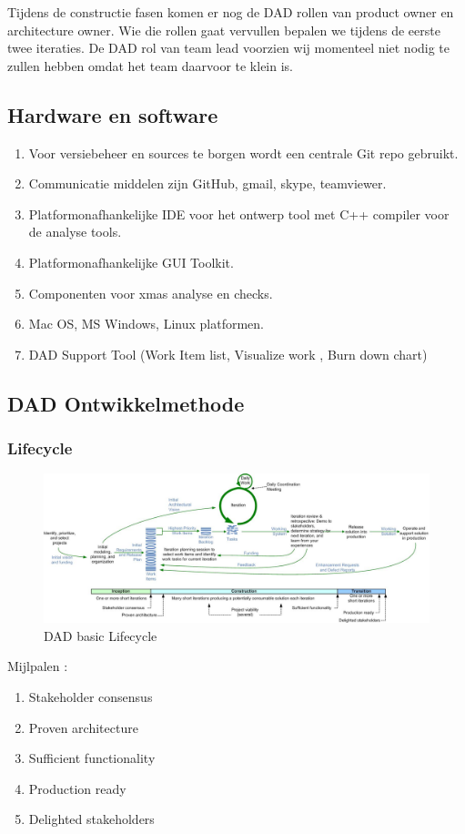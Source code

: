  Tijdens de constructie fasen komen er nog de DAD rollen van product owner en architecture owner.
 Wie die rollen gaat vervullen bepalen we tijdens de eerste twee iteraties.
 De DAD rol van team lead voorzien wij momenteel niet nodig te zullen hebben omdat het team daarvoor
 te klein is.


\subsection{Hardware en software}
\begin{enumerate}
	\item Voor versiebeheer en sources te borgen wordt een centrale Git repo gebruikt.
	\item Communicatie middelen zijn GitHub, gmail, skype,  teamviewer.
	\item Platformonafhankelijke IDE voor het ontwerp tool met C++ compiler voor de analyse tools.
	\item Platformonafhankelijke GUI Toolkit.
	\item Componenten voor xmas analyse en checks.
	\item Mac OS,  MS Windows, Linux platformen.
	\item DAD Support Tool (Work Item list, Visualize work , Burn down chart)
\end{enumerate}


\subsection{DAD Ontwikkelmethode}
\subsubsection{Lifecycle}

\begin{figure}[h]
  \includegraphics[width=1.0\textwidth]{dadLifecycleUP2}
  \caption{DAD basic Lifecycle}
\end{figure}
Mijlpalen :
\begin{enumerate}
\item Stakeholder consensus
\item Proven architecture
\item Sufficient functionality
\item Production ready
\item Delighted stakeholders
\end{enumerate}


